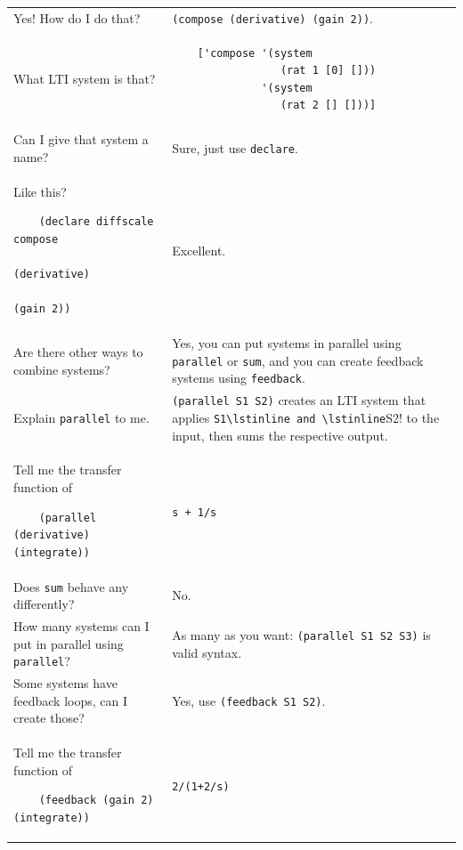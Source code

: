 \documentclass[11pt,letter]{article}
\begin{document}
\begin{longtable}{ p{} p{} }
  Yes! How do I do that?
  &
  \lstinline!(compose (derivative) (gain 2))!. \\

  What LTI system is that?
  &
  \begin{lstlisting}
    ['compose '(system
                 (rat 1 [0] []))
              '(system
                 (rat 2 [] []))]
  \end{lstlisting} \\

  Can I give that system a name?
  &
  Sure, just use \lstinline!declare!. \\

  Like this?
  \begin{lstlisting}
    (declare diffscale compose
                         (derivative)
                         (gain 2))
  \end{lstlisting}
  &
  Excellent. \\

  Are there other ways to combine systems?
  &
  Yes, you can put systems in parallel using \lstinline!parallel! or \lstinline!sum!, and you can create feedback systems using \lstinline!feedback!. \\

  Explain \lstinline!parallel! to me.
  &
  \lstinline!(parallel S1 S2)! creates an LTI system that applies \lstinline!S1\lstinline and \lstinline!S2! to the input, then sums the respective output. \\

  Tell me the transfer function of
  \begin{lstlisting}
    (parallel (derivative) (integrate))
  \end{lstlisting}
  &
  \lstinline!s + 1/s! \\

  Does \lstinline!sum! behave any differently?
  &
  No. \\

  How many systems can I put in parallel using \lstinline!parallel!?
  &
  As many as you want: \lstinline!(parallel S1 S2 S3)! is valid syntax. \\

  Some systems have feedback loops, can I create those?
  &
  Yes, use \lstinline!(feedback S1 S2)!. \\

  Tell me the transfer function of
  \begin{lstlisting}
    (feedback (gain 2) (integrate))
  \end{lstlisting}
  &
  \lstinline!2/(1+2/s)! \\


\end{longtable}
\end{document}

